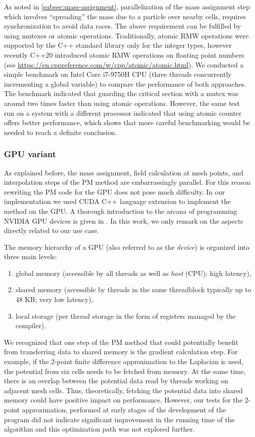 As noted in \autoref{subsec:mass-assignment}, parallelization of the mass assignment step which involves ``spreading'' the mass due to a particle over nearby cells, requires synchronization to avoid data races.
The above requirement can be fulfilled by using mutexes or atomic operations.
Traditionally, atomic RMW operations were supported by the C++ standard library only for the integer types, however recently C++20 introduced atomic RMW operations on floating point numbers (see \url{https://en.cppreference.com/w/cpp/atomic/atomic.html}).
We conducted a simple benchmark on Intel Core i7-9750H CPU (three threads concurrently incrementing a global variable) to compare the performance of both approaches.
The benchmark indicated that guarding the critical section with a mutex was around two times faster than using atomic operations.
However, the same test run on a system with a different processor indicated that using atomic counter offers better performance, which shows that more careful benchmarking would be needed to reach a definite conclusion.

\subsubsection{GPU variant}
As explained before, the mass assignment, field calculation at mesh points, and interpolation steps of the PM method are embarrassingly parallel.
For this reason rewriting the PM code for the GPU does not pose much difficulty.
In our implementation we used CUDA C++ language extension to implement the method on the GPU.
A thorough introduction to the arcana of programming NVIDIA GPU devices is given in \cite{nvidia2025cuda}.
In this work, we only remark on the aspects directly related to our use case.

The memory hierarchy of a GPU (also referred to as the \textit{device}) is organized into three main levels:
\begin{enumerate}
    \item global memory (accessible by all threads as well as \textit{host} (CPU); high latency),
    \item shared memory (accessible by threads in the same threadblock typically up to 48 KB; very low latency),
    \item local storage (per thread storage in the form of registers managed by the compiler).
\end{enumerate}
We recognized that one step of the PM method that could potentially benefit from transferring data to shared memory is the gradient calculation step.
For example, if the 2-point finite difference approximation to the Laplacian is used, the potential from six cells needs to be fetched from memory.
At the same time, there is an overlap between the potential data read by threads working on adjacent mesh cells.
Thus, theoretically, fetching the potential data into shared memory could have positive impact on performance.
However, our tests for the 2-point approximation, performed at early stages of the development of the program did not indicate significant improvement in the running time of the algorithm and this optimization path was not explored further.

